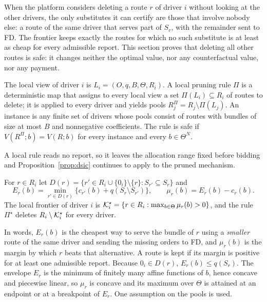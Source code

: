 When the platform considers deleting a route $r$ of driver $i$ without
looking at the other drivers, the only substitutes it can certify are those
that involve nobody else: a route of the same driver that serves part of
$S_r$, with the remainder sent to FD. The frontier keeps exactly the routes
for which no such substitute is at least as cheap for every admissible
report. This section proves that deleting all other routes is safe: it
changes neither the optimal value, nor any counterfactual value, nor any
payment.

\begin{definition}
\label{def:local}
The local view of driver $i$ is $L_i=(O,q,B,\Theta,R_i)$. A local pruning
rule $\Pi$ is a deterministic map that assigns to every local view a set
$\Pi(L_i)\subseteq R_i$ of routes to delete; it is applied to every driver
and yields pools $R^\Pi_j=R_j\setminus\Pi(L_j)$. An instance is any finite
set of drivers whose pools consist of routes with bundles of size at most
$B$ and nonnegative coefficients. The rule is safe if $V(R^\Pi;b)=V(R;b)$
for every instance and every $b\in\Theta^N$.
\end{definition}

A local rule reads no report, so it leaves the allocation range fixed before
bidding and Proposition~\ref{prop:dsic} continues to apply to the pruned
mechanism.

\begin{definition}
\label{def:frontier}
For $r\in R_i$ let $D(r)=\{r'\in R_i\cup\{0_i\}\setminus\{r\}:S_{r'}\subseteq S_r\}$
and
\begin{equation}
E_r(b)=\min_{r'\in D(r)}\bigl\{c_{r'}(b)+q(S_r\setminus S_{r'})\bigr\},\qquad
\mu_r(b)=E_r(b)-c_r(b).
\label{eq:envelope}
\end{equation}
The local frontier of driver $i$ is
$\mathcal{K}^\star_i=\{r\in R_i:\max_{b\in\Theta}\mu_r(b)>0\}$, and the rule $\Pi^\star$
deletes $R_i\setminus\mathcal{K}^\star_i$ for every driver.
\end{definition}

In words, $E_r(b)$ is the cheapest way to serve the bundle of $r$ using a
\emph{smaller} route of the same driver and sending the missing orders to
FD, and $\mu_r(b)$ is the margin by which $r$ beats that alternative. A route
is kept if its margin is positive for at least one admissible report.
Because $0_i\in D(r)$, $E_r(b)\le q(S_r)$. The envelope $E_r$ is the minimum
of finitely many affine functions of $b$, hence concave and piecewise linear,
so $\mu_r$ is concave and its maximum over $\Theta$ is attained at an
endpoint or at a breakpoint of $E_r$. One assumption on the pools is used.

